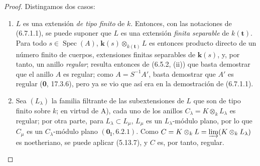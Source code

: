 \begin{proof}
Distingamos dos casos:

\begin{enumerate}
\item[A)] $L$ es una extensión \emph{de tipo finito} de $k$. Entonces, con las
notaciones de (6.7.1.1), se puede suponer que $L$ es una extensión \emph{finita
separable} de $k(\mathbf t)$. Para todo $s\in\operatorname{Spec}(A)$,
$\boldsymbol{k}(s)\otimes_{k(\mathbf t)}L$ es entonces producto directo de un
número finito de cuerpos, extensiones finitas separables de $\boldsymbol{k}(s)$, y, por
tanto, un anillo \emph{regular}; resulta entonces de (6.5.2, (ii)) que basta
demostrar que el anillo $A$ es regular; como $A=S^{-1}A'$, basta demostrar
que $A'$ es regular (\textbf 0, 17.3.6), pero ya se vio que así era en la demostración
de (6.7.1.1).
\item[B)] Sea $(L_\lambda)$ la familia filtrante de las subextensiones de
$L$ que son de tipo finito sobre $k$; en virtud de A), cada uno de los
anillos $C_\lambda=K\otimes_kL_\lambda$ es regular; por otra parte, para
$L_\lambda\subset L_\mu$, $L_\mu$ es un $L_\lambda$-módulo plano, por lo
que $C_\mu$ es un $C_\lambda$-módulo plano $(\mathbf{0}_{\mathrm I},6.2.1)$. Como
$C=K\otimes_kL=\varinjlim(K\otimes_kL_\lambda)$ es noetheriano, se puede
aplicar (5.13.7), y $C$ es, por tanto, regular.
\end{enumerate}
\end{proof}
